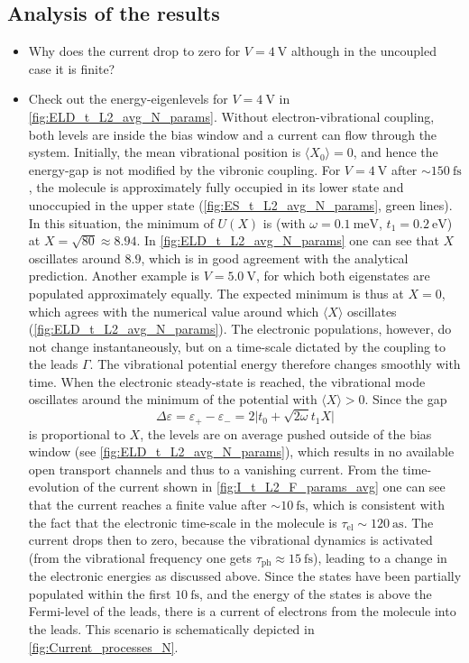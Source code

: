 \documentclass{article}
\begin{document}
\subsection{Analysis of the results}
\begin{itemize}
\item[Q:] Why does the current drop to zero for $V=\SI{4}{\volt}$ although in the uncoupled case it is finite?	
\item[A:] Check out the energy-eigenlevels for $V=\SI{4}{\volt}$ in \cref{fig:ELD_t_L2_avg_N_params}. Without electron-vibrational coupling, both levels are inside the bias window and a current can flow through the system. Initially, the mean vibrational position is $\langle X_0\rangle = 0$, and hence the energy-gap is not modified by the vibronic coupling.
For $V=\SI{4}{\volt}$ after $\sim \SI{150}{\femto\second}$, the molecule is approximately fully occupied in its lower state and unoccupied in the upper state (\cref{fig:ES_t_L2_avg_N_params}, green lines). In this situation, the minimum of $U(X)$ is (with $\omega=\SI{0.1}{\milli\electronvolt}$, $t_1=\SI{0.2}{\electronvolt}$) at $X=\sqrt{80}\approx 8.94$. In \cref{fig:ELD_t_L2_avg_N_params} one can see that $X$ oscillates around $8.9$, which is in good agreement with the analytical prediction. 
Another example is $V=\SI{5.0}{\volt}$, for which both eigenstates are populated approximately equally. The expected minimum is thus at $X=0$, which agrees with the numerical value around which $\langle X\rangle$ oscillates (\cref{fig:ELD_t_L2_avg_N_params}).
The electronic populations, however, do not change instantaneously, but on a time-scale dictated by the coupling to the leads $\Gamma$. The vibrational potential energy therefore changes smoothly with time. When the electronic steady-state is reached, the vibrational mode oscillates around the minimum of the potential with $\langle X\rangle >0$. Since the gap 
\begin{equation}
	\Delta\varepsilon = \varepsilon_+-\varepsilon_- = 2\vert t_0+\sqrt{2\omega}t_1X\vert \label{eq:GapXDep}
\end{equation}
is proportional to $X$, the levels are on average pushed outside of the bias window (see \cref{fig:ELD_t_L2_avg_N_params}), which results in no available open transport channels and thus to a vanishing current. From the time-evolution of the current shown in \cref{fig:I_t_L2_F_params_avg} one can see that the current reaches a finite value after $\sim \SI{10}{\femto\second}$, which is consistent with the fact that the electronic time-scale in the molecule is  $\tau_\mathrm{el}\sim \SI{120}{\atto\second}$. The current drops then to zero, because the vibrational dynamics is activated (from the vibrational frequency one gets $\tau_\mathrm{ph}\approx \SI{15}{\femto\second}$), leading to a change in the electronic energies as discussed above. Since the states have been partially populated within the first $\SI{10}{\femto\second}$, and the energy of the states is above the Fermi-level of the leads, there is a current of electrons from the molecule into the leads. This scenario is schematically depicted in \cref{fig:Current_processes_N}.

\end{itemize}
\end{document}
